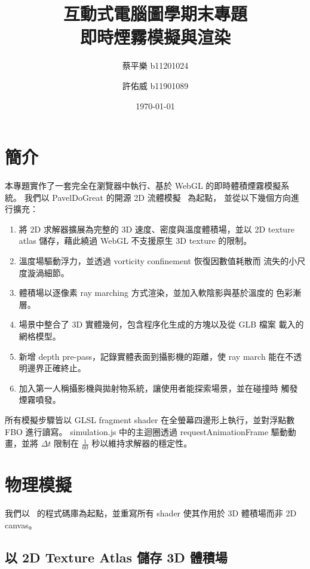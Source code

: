 \documentclass[a4paper, 12pt]{article}
\title{互動式電腦圖學期末專題\\[0.3em]
       \large{即時煙霧模擬與渲染}}
\author{蔡平樂 b11201024 \and 許佑威 b11901089}
\date{\today}
\begin{document}
\vspace{-2em}
\maketitle
\vspace{-3em}

\section{簡介}

本專題實作了一套完全在瀏覽器中執行、基於 WebGL 的即時體積煙霧模擬系統。
我們以 PavelDoGreat 的開源 2D 流體模擬~\cite{pavelfluid} 為起點，
並從以下幾個方向進行擴充：

\begin{enumerate}[leftmargin=*, nosep]
  \item 將 2D 求解器擴展為完整的 3D 速度、密度與溫度體積場，並以 2D
        texture atlas 儲存，藉此繞過 WebGL 不支援原生 3D texture 的限制。
  \item 溫度場驅動浮力，並透過 vorticity confinement 恢復因數值耗散而
        流失的小尺度漩渦細節。
  \item 體積場以逐像素 ray marching 方式渲染，並加入軟陰影與基於溫度的
        色彩漸層。
  \item 場景中整合了 3D 實體幾何，包含程序化生成的方塊以及從 GLB 檔案
        載入的網格模型。
  \item 新增 depth pre-pass，記錄實體表面到攝影機的距離，使 ray march
        能在不透明邊界正確終止。
  \item 加入第一人稱攝影機與拋射物系統，讓使用者能探索場景，並在碰撞時
        觸發煙霧噴發。
\end{enumerate}

所有模擬步驟皆以 GLSL fragment shader 在全螢幕四邊形上執行，並對浮點數
FBO 進行讀寫。
simulation.js 中的主迴圈透過 requestAnimationFrame 驅動動畫，並將
$\Delta t$ 限制在 $\tfrac{1}{60}$ 秒以維持求解器的穩定性。

\section{物理模擬}

我們以~\cite{pavelfluid} 的程式碼庫為起點，並重寫所有 shader 使其作用於
3D 體積場而非 2D canvas。

\subsection{以 2D Texture Atlas 儲存 3D 體積場}
\end{document}
